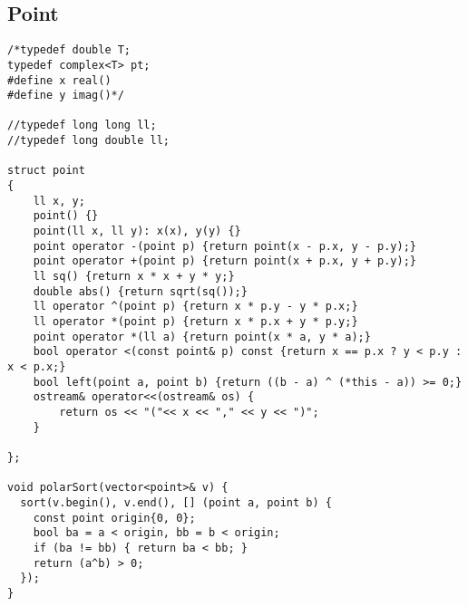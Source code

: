 \subsection*{Point}
\begin{lstlisting}
/*typedef double T;
typedef complex<T> pt;
#define x real()
#define y imag()*/

//typedef long long ll;
//typedef long double ll;

struct point
{
	ll x, y;
	point() {}
	point(ll x, ll y): x(x), y(y) {}
	point operator -(point p) {return point(x - p.x, y - p.y);}
	point operator +(point p) {return point(x + p.x, y + p.y);}
	ll sq() {return x * x + y * y;}
	double abs() {return sqrt(sq());}
	ll operator ^(point p) {return x * p.y - y * p.x;}
  	ll operator *(point p) {return x * p.x + y * p.y;}
  	point operator *(ll a) {return point(x * a, y * a);}
	bool operator <(const point& p) const {return x == p.x ? y < p.y : x < p.x;}
	bool left(point a, point b) {return ((b - a) ^ (*this - a)) >= 0;}
	ostream& operator<<(ostream& os) {
		return os << "("<< x << "," << y << ")";
	}

};

void polarSort(vector<point>& v) {
  sort(v.begin(), v.end(), [] (point a, point b) {
    const point origin{0, 0};
    bool ba = a < origin, bb = b < origin;
    if (ba != bb) { return ba < bb; }
    return (a^b) > 0;
  });
}\end{lstlisting}

